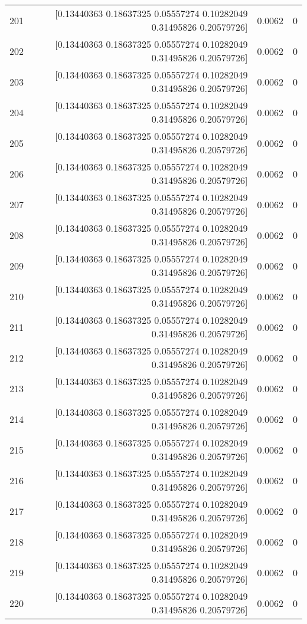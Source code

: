 \begin{longtable}{lrrr}
201 & [0.13440363 0.18637325 0.05557274 0.10282049 0.31495826 0.20579726] & 0.0062 & 0 \\
202 & [0.13440363 0.18637325 0.05557274 0.10282049 0.31495826 0.20579726] & 0.0062 & 0 \\
203 & [0.13440363 0.18637325 0.05557274 0.10282049 0.31495826 0.20579726] & 0.0062 & 0 \\
204 & [0.13440363 0.18637325 0.05557274 0.10282049 0.31495826 0.20579726] & 0.0062 & 0 \\
205 & [0.13440363 0.18637325 0.05557274 0.10282049 0.31495826 0.20579726] & 0.0062 & 0 \\
206 & [0.13440363 0.18637325 0.05557274 0.10282049 0.31495826 0.20579726] & 0.0062 & 0 \\
207 & [0.13440363 0.18637325 0.05557274 0.10282049 0.31495826 0.20579726] & 0.0062 & 0 \\
208 & [0.13440363 0.18637325 0.05557274 0.10282049 0.31495826 0.20579726] & 0.0062 & 0 \\
209 & [0.13440363 0.18637325 0.05557274 0.10282049 0.31495826 0.20579726] & 0.0062 & 0 \\
210 & [0.13440363 0.18637325 0.05557274 0.10282049 0.31495826 0.20579726] & 0.0062 & 0 \\
211 & [0.13440363 0.18637325 0.05557274 0.10282049 0.31495826 0.20579726] & 0.0062 & 0 \\
212 & [0.13440363 0.18637325 0.05557274 0.10282049 0.31495826 0.20579726] & 0.0062 & 0 \\
213 & [0.13440363 0.18637325 0.05557274 0.10282049 0.31495826 0.20579726] & 0.0062 & 0 \\
214 & [0.13440363 0.18637325 0.05557274 0.10282049 0.31495826 0.20579726] & 0.0062 & 0 \\
215 & [0.13440363 0.18637325 0.05557274 0.10282049 0.31495826 0.20579726] & 0.0062 & 0 \\
216 & [0.13440363 0.18637325 0.05557274 0.10282049 0.31495826 0.20579726] & 0.0062 & 0 \\
217 & [0.13440363 0.18637325 0.05557274 0.10282049 0.31495826 0.20579726] & 0.0062 & 0 \\
218 & [0.13440363 0.18637325 0.05557274 0.10282049 0.31495826 0.20579726] & 0.0062 & 0 \\
219 & [0.13440363 0.18637325 0.05557274 0.10282049 0.31495826 0.20579726] & 0.0062 & 0 \\
220 & [0.13440363 0.18637325 0.05557274 0.10282049 0.31495826 0.20579726] & 0.0062 & 0 \\

\end{longtable}
